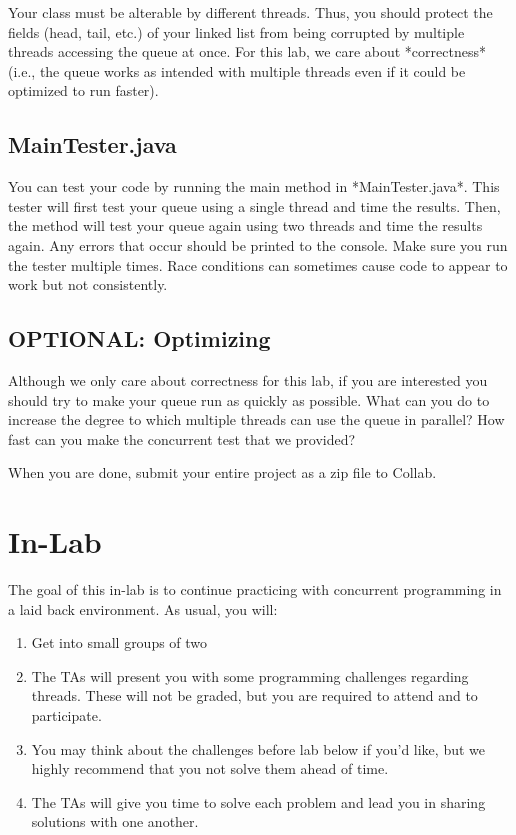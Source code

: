 \documentclass[paper=a4, fontsize=11pt, parskip=full]{scrartcl} %
\numberwithin{equation}{section} %
\numberwithin{figure}{section} %
\numberwithin{table}{section} %
\begin{document}
Your class must be alterable by different threads. Thus, you should protect the fields (head, tail, etc.) of your linked list from being corrupted by multiple threads accessing the queue at once. For this lab, we care about *correctness* (i.e., the queue works as intended with multiple threads even if it could be optimized to run faster).

\subsection{MainTester.java}

You can test your code by running the main method in *MainTester.java*. This tester will first test your queue using a single thread and time the results. Then, the method will test your queue again using two threads and time the results again. Any errors that occur should be printed to the console. Make sure you run the tester multiple times. Race conditions can sometimes cause code to appear to work but not consistently.

\subsection{OPTIONAL: Optimizing}

Although we only care about correctness for this lab, if you are interested you should try to make your queue run as quickly as possible. What can you do to increase the degree to which multiple threads can use the queue in parallel? How fast can you make the concurrent test that we provided?

When you are done, submit your entire project as a zip file to Collab.



\newpage
\section{In-Lab}

The goal of this in-lab is to continue practicing with concurrent programming in a laid back environment. As usual, you will:

\begin{enumerate}
	\item Get into small groups of two
	\item The TAs will present you with some programming challenges regarding threads. These will not be graded, but you are required to attend and to participate.
	\item You may think about the challenges before lab below if you'd like, but we highly recommend that you not solve them ahead of time.
	\item The TAs will give you time to solve each problem and lead you in sharing solutions with one another.
\end{enumerate}
\end{document}
